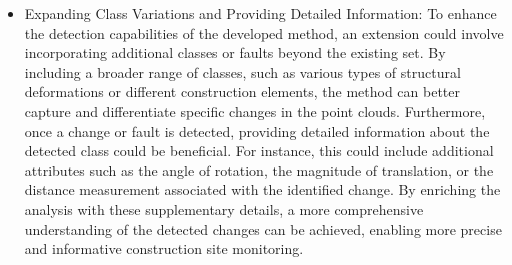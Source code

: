 \begin{itemize}
    \item Expanding Class Variations and Providing Detailed Information: To enhance the detection capabilities of the developed method, an extension could involve incorporating additional classes or faults beyond the existing set. By including a broader range of classes, such as various types of structural deformations or different construction elements, the method can better capture and differentiate specific changes in the point clouds. Furthermore, once a change or fault is detected, providing detailed information about the detected class could be beneficial. For instance, this could include additional attributes such as the angle of rotation, the magnitude of translation, or the distance measurement associated with the identified change. By enriching the analysis with these supplementary details, a more comprehensive understanding of the detected changes can be achieved, enabling more precise and informative construction site monitoring.
    
\end{itemize}